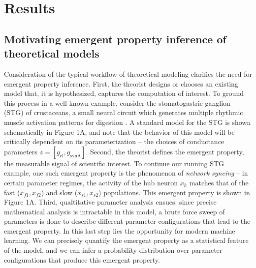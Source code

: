 \documentclass[11pt]{article}
\begin{document}


\section{Results}

\subsection{Motivating emergent property inference of theoretical models}

Consideration of the typical workflow of theoretical modeling clarifies the need for emergent property inference.  
First, the theorist designs or chooses an existing model that, it is hypothesized, captures the computation of interest. 
 To ground this process in a well-known example, consider the stomatogastric ganglion (STG) of crustaceans, a small neural circuit which generates multiple rhythmic muscle activation patterns for digestion \cite{prinz2004similar}.  
 A standard model for the STG is shown schematically in Figure 1A, and note that the behavior of this model will be critically dependent on its parameterization -- the choices of conductance parameters $z = [g_{\text{el}}, g_{\text{synA}}]$.
Second, the theorist defines the emergent property, the measurable signal of scientific interest.  
To continue our running STG example, one such emergent property is the phenomenon of \emph{network syncing} -- in certain parameter regimes, the activity of the hub neuron $x_h$ matches that of the fast ($x_{f1},x_{f2}$) and slow ($x_{s1},x_{s2}$) populations.  This emergent property is shown in Figure 1A.
Third, qualtitative parameter analysis ensues: since precise mathematical analysis is intractable in this model, a brute force sweep of parameters is done to describe different parameter configurations that lead to the emergent property.  
In this last step lies the opportunity for modern machine learning.  We can precisely quantify the emergent property as a statistical feature of the model, and we can infer a probability distribution over parameter configurations that produce this emergent property. 
\end{document}
